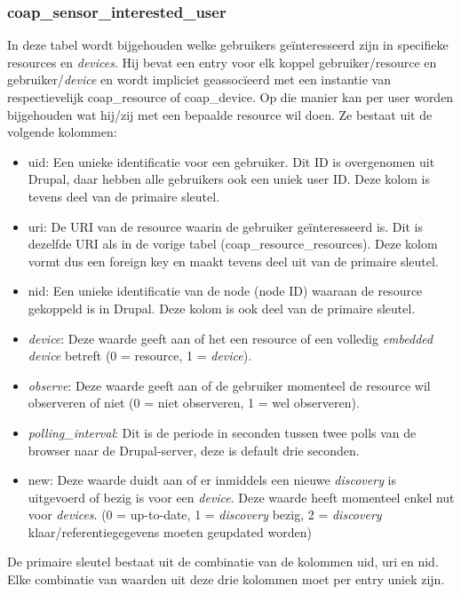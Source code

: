 \subsubsection{coap\_sensor\_interested\_user}
In deze tabel wordt bijgehouden welke gebruikers ge\"{i}nteresseerd zijn in specifieke resources en \textit{devices}. Hij bevat een entry voor elk koppel gebruiker/resource en gebruiker/\textit{device} en wordt impliciet geassoc\"{i}eerd met een instantie van respectievelijk coap\_resource of coap\_device. Op die manier kan per user worden bijgehouden wat hij/zij met een bepaalde resource wil doen. Ze bestaat uit de volgende kolommen:
\begin{itemize}
\item uid: Een unieke identificatie voor een gebruiker. Dit ID is overgenomen uit Drupal, daar hebben alle gebruikers ook een uniek user ID. Deze kolom is tevens deel van de primaire sleutel.
\item uri: De URI van de resource waarin de gebruiker ge\"{i}nteresseerd is. Dit is dezelfde URI als in de vorige tabel (coap\_resource\_resources). Deze kolom vormt dus een foreign key en maakt tevens deel uit van de primaire sleutel.
\item nid: Een unieke identificatie van de node (node ID) waaraan de resource gekoppeld is in Drupal. Deze kolom is ook deel van de primaire sleutel.
\item \textit{device}: Deze waarde geeft aan of het een resource of een volledig \textit{embedded device} betreft (0 = resource, 1 = \textit{device}).
\item \textit{observe}: Deze waarde geeft aan of de gebruiker momenteel de resource wil observeren of niet (0 = niet observeren, 1 = wel observeren).
\item \textit{polling\_interval}: Dit is de periode in seconden tussen twee polls van de browser naar de Drupal-server, deze is default drie seconden.
\item new: Deze waarde duidt aan of er inmiddels een nieuwe \textit{discovery} is uitgevoerd of bezig is voor een \textit{device}. Deze waarde heeft momenteel enkel nut voor \textit{devices}. (0 = up-to-date, 1 = \textit{discovery} bezig, 2 = \textit{discovery} klaar/referentiegegevens moeten geupdated worden)
\end{itemize}
De primaire sleutel bestaat uit de combinatie van de kolommen uid, uri en nid. Elke combinatie van waarden uit deze drie kolommen moet per entry uniek zijn.

